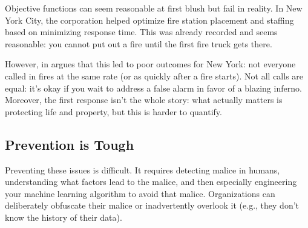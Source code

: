 Objective functions can seem reasonable at first blush but fail in
reality.  In New York City, the  corporation helped optimize
fire station placement and staffing based on minimizing response
time.  This was already recorded and seems reasonable: you cannot put
out a fire until the first fire truck gets there.


However, \citet{spufford-10} in  argues that this led to
poor outcomes for New York: not everyone called in fires at the same
rate (or as quickly after a fire starts).  Not all calls are equal:
it's okay if you wait to address a false alarm in favor of a blazing
inferno.  Moreover, the first response isn't the whole story: what
actually matters is protecting life and property, but this is harder
to quantify.

\subsection{Prevention is Tough}

Preventing these issues is difficult.  It requires detecting malice in
humans, understanding what factors lead to the malice, and then
especially engineering your machine learning algorithm to avoid that
malice.  Organizations can deliberately obfuscate their malice or
inadvertently overlook it (e.g., they don't know the history of their
data).

